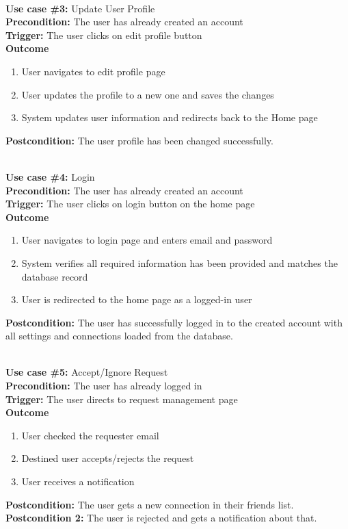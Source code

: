 \documentclass[12pt]{article}
\begin{document}
\noindent\\
\textbf{Use case \#3:} Update User Profile\\
\textbf{Precondition:} The user has already created an account\\
\textbf{Trigger:} The user clicks on edit profile button\\
\textbf{Outcome}
\begin{enumerate}
	\item User navigates to edit profile page
    \item User updates the profile to a new one and saves the changes
    \item System updates user information and redirects back to the Home page
\end{enumerate}
\textbf{Postcondition:} The user profile has been changed successfully.


\noindent\\
\textbf{Use case \#4:} Login\\
\textbf{Precondition:} The user has already created an account\\
\textbf{Trigger:} The user clicks on login button on the home page\\
\textbf{Outcome}
\begin{enumerate}
	\item User navigates to login page and enters email and password
    \item System verifies all required information has been provided and matches the database record
    \item User is redirected to the home page as a logged-in user
\end{enumerate}
\textbf{Postcondition:} The user has successfully logged in to the created account with all settings and connections loaded from the database.


\noindent\\
\textbf{Use case \#5:} Accept/Ignore Request\\
\textbf{Precondition:} The user has already logged in\\
\textbf{Trigger:} The user directs to request management page\\
\textbf{Outcome}
\begin{enumerate}
    \item User checked the requester email
    \item Destined user accepts/rejects the request
    \item User receives a notification
\end{enumerate}
\textbf{Postcondition:} The user gets a new connection in their friends list.\\
\textbf{Postcondition 2:} The user is rejected and gets a notification about that.
\end{document}
